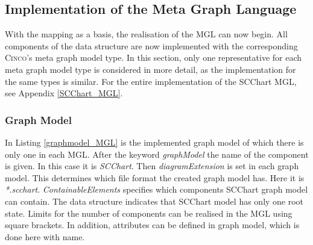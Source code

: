 \subsection{Implementation of the Meta Graph Language}
With the mapping as a basis, the realisation of the MGL can now begin. All components of the data structure are now implemented with the corresponding \textsc{Cinco}'s meta graph model type. In this section, only one representative for each meta graph model type is considered in more detail, as the implementation for the same types is similar. For the entire implementation of the SCChart MGL, see Appendix \ref{SCChart_MGL}.

\subsubsection{Graph Model}
In Listing \ref{graphmodel_MGL} is the implemented graph model of which there is only one in each MGL. After the keyword \textit{graphModel} the name of the component is given. In this case it is \textit{SCChart}. Then \textit{diagramExtension} is set in each graph model. This determines which file format the created graph model has. Here it is \textit{*.scchart}. \textit{ContainableElements} specifies which components SCChart graph model can contain. The data structure indicates that SCChart model has only one root state. Limits for the number of components can be realised in the MGL using square brackets. In addition, attributes can be defined in graph model, which is done here with name.


